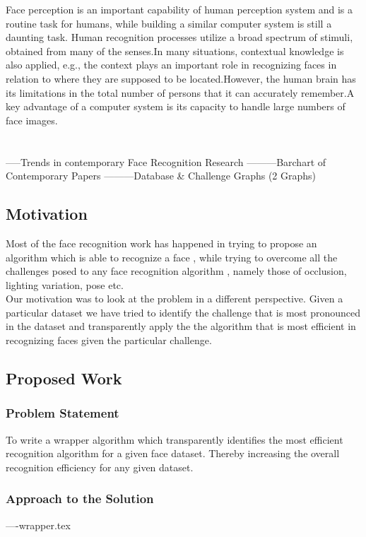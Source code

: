\documentclass[12pt,a4paper]{book}
\begin{document}
Face perception is an important capability of human perception system and is a
routine task for humans, while building a similar computer system is still a daunting
task. Human recognition processes utilize a broad spectrum of stimuli, obtained from many of the senses.In many situations, contextual knowledge is also applied, e.g., the context plays
an important role in recognizing faces in relation to where they are supposed to be
located.However, the
human brain has its limitations in the total number of persons that it can accurately
remember.A key advantage of a computer system is its capacity to handle large
numbers of face images.\\ \\ \\

				-----Trends in contemporary Face Recognition Research
		---------Barchart  of Contemporary Papers
		---------Database & Challenge Graphs (2 Graphs)

	\subsection{Motivation}
		Most of the face recognition work has happened in trying to propose an
		algorithm which is able to recognize a face , while trying to overcome 
		all the challenges posed to any face recognition algorithm , namely those
		of occlusion, lighting variation, pose etc.  \\ 
			Our motivation was to look at the problem in a different perspective.
		Given a particular dataset we have tried to identify the challenge that is
		most pronounced in the dataset and transparently apply the the algorithm that
		is most efficient in recognizing faces given the particular challenge.

	\subsection{Proposed Work}

		\subsubsection{Problem Statement}
			To write a wrapper algorithm which transparently identifies the most 				efficient recognition
			algorithm for a given face dataset. Thereby increasing the overall 					recognition efficiency for
			any given dataset.

		\subsubsection{Approach to the Solution}
			----wrapper.tex
\end{document}
